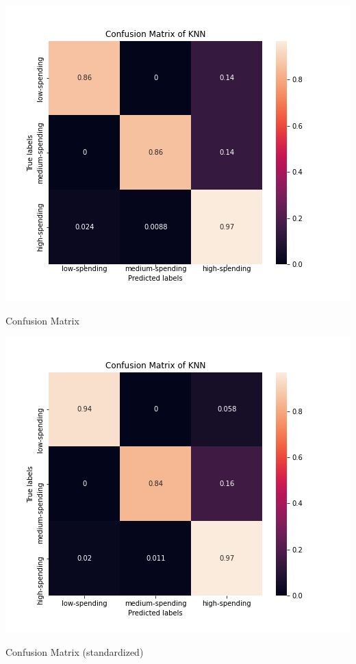 \documentclass[12pt]{article}
\begin{document}
\begin{table}[ht]
\begin{minipage}[b]{0.5\linewidth}
\centering
    \includegraphics[scale=0.5]{images/figure_KNN_without_scaler.png}
\caption{Confusion Matrix}
\label{fig:image}
\end{minipage}
\begin{minipage}[b]{0.5\linewidth}
\centering
    \includegraphics[scale=0.5]{images/figure_KNN_with_scaler.png}
\caption{Confusion Matrix (standardized)}
\label{fig:image}
\end{minipage}
\end{table}
\end{document}
